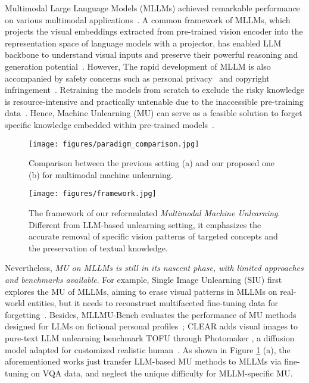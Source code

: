 Multimodal Large Language Models (MLLMs) achieved remarkable performance on various multimodal applications~\cite{li2025benchmark,zou2025deep,yan2024survey,yan2024errorradar,dang2024explainable}. A common framework of MLLMs, which projects the visual embeddings extracted from pre-trained vision encoder into the representation space of language models with a projector, has enabled LLM backbone to understand visual inputs and preserve their powerful reasoning and generation potential~\cite{liu2024llava,yan2025position,huo2024mmneuron}. 
However, The rapid development of MLLM is also accompanied by safety concerns such as personal privacy~\cite{pi2024mmprivacy} and copyright infringement~\cite{li2024digger}. Retraining the models from scratch to exclude the risky knowledge is resource-intensive and practically untenable due to the inaccessible pre-training data~\cite{bourtoule2021mu,si2023llmu_survey}. Hence, Machine Unlearning (MU) can serve as a feasible solution to forget specific knowledge embedded within pre-trained models~\cite{blanco2025llm_mu}.\par

\begin{figure}[!t]
    \centering
    \texttt{[image: figures/paradigm\_comparison.jpg]}
    \caption{Comparison between the previous setting (a) and our proposed one (b) for multimodal machine unlearning.}
    \label{fig:paradigm_comparison}
    \vspace{-4mm}
\end{figure}


\begin{figure*}[thp]
    \centering
    \texttt{[image: figures/framework.jpg]}
    \caption{The framework of our reformulated \emph{Multimodal Machine Unlearning}. Different from LLM-based unlearning setting, it emphasizes the accurate removal of specific vision patterns of targeted concepts and the preservation of textual knowledge.}
    \label{fig:framework}
\end{figure*}

Nevertheless, \textit{MU on MLLMs is still in its nascent phase, with limited approaches and benchmarks available}. For example, Single Image Unlearning (SIU) first explores the MU of MLLMs, aiming to erase visual patterns in MLLMs on real-world entities, but it needs to reconstruct multifaceted fine-tuning data for forgetting~\cite{li2024siu}. Besides, MLLMU-Bench evaluates the performance of MU methods designed for LLMs on fictional personal profiles~\cite{liu2024mllmubench}; CLEAR adds visual images to pure-text LLM unlearning benchmark TOFU through Photomaker \cite{li2024photomaker}, a diffusion model adapted for customized realistic human~\cite{dontsov2024clear}. As shown in Figure \ref{fig:paradigm_comparison} (a), the aforementioned works just transfer LLM-based MU methods to MLLMs via fine-tuning on VQA data, and neglect the unique difficulty for MLLM-specific MU.\par

